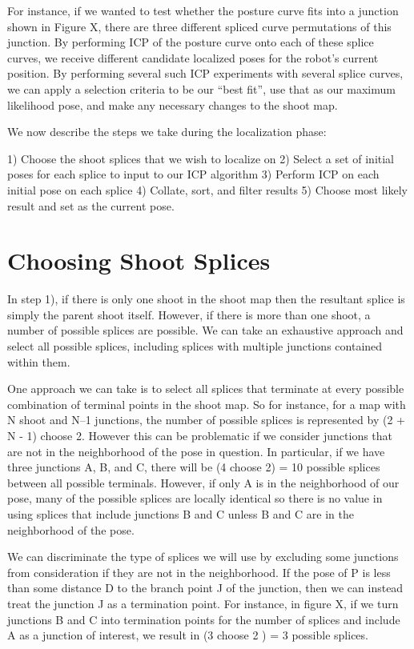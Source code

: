 For instance, if we wanted to test whether the posture curve fits into a junction shown in Figure X, there are three different spliced curve permutations of this junction. By performing ICP of the posture curve onto each of these splice curves, we receive different candidate localized poses for the robot’s current position. By performing several such ICP experiments with several splice curves, we can apply a selection criteria to be our “best fit”, use that as our maximum likelihood pose, and make any necessary changes to the shoot map.

We now describe the steps we take during the localization phase:

1) Choose the shoot splices that we wish to localize on
2) Select a set of initial poses for each splice to input to our ICP algorithm
3) Perform ICP on each initial pose on each splice
4) Collate, sort, and filter results
5) Choose most likely result and set as the current pose.

\section{Choosing Shoot Splices}
\label{choosingshootsplices}

In step 1), if there is only one shoot in the shoot map then the resultant splice is simply the parent shoot itself. However, if there is more than one shoot, a number of possible splices are possible. We can take an exhaustive approach and select all possible splices, including splices with multiple junctions contained within them.

One approach we can take is to select all splices that terminate at every possible combination of terminal points in the shoot map. So for instance, for a map with N shoot and N--1 junctions, the number of possible splices is represented by (2 + N - 1) choose 2. However this can be problematic if we consider junctions that are not in the neighborhood of the pose in question. In particular, if we have three junctions A, B, and C, there will be (4 choose 2) = 10 possible splices between all possible terminals. However, if only A is in the neighborhood of our pose, many of the possible splices are locally identical so there is no value in using splices that include junctions B and C unless B and C are in the neighborhood of the pose.

We can discriminate the type of splices we will use by excluding some junctions from consideration if they are not in the neighborhood. If the pose of P is less than some distance D to the branch point J of the junction, then we can instead treat the junction J as a termination point. For instance, in figure X, if we turn junctions B and C into termination points for the number of splices and include A as a junction of interest, we result in (3 choose 2 ) = 3 possible splices.

